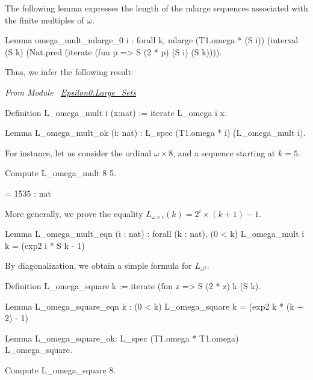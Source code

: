 The following lemma expresses the length of the mlarge sequences associated with the finite multiples of $\omega$.


\begin{Coqsrc}
Lemma omega_mult_mlarge_0 i  : forall k,
    mlarge  (T1.omega * (S i))
            (interval (S k)
                      (Nat.pred (iterate (fun p =>  S (2 * p)%
                                         (S i)
                                         (S k)))).
\end{Coqsrc}

Thus, we infer the following result:

\emph{From Module~ \href{../theories/html/hydras.Epsilon0.Large_Sets.html\#L_omega_mult}{Epsilon0.Large\_Sets}}

\begin{Coqsrc}
Definition L_omega_mult i (x:nat) :=  iterate L_omega i x.

Lemma L_omega_mult_ok (i: nat) :  L_spec (T1.omega * i) (L_omega_mult i).
\end{Coqsrc}

For instance, let us consider the ordinal $\omega\times 8$, and a sequence 
starting at $k=5$.

\begin{Coqsrc}
Compute L_omega_mult 8 5.
\end{Coqsrc}

\begin{Coqanswer}
= 1535
     : nat
\end{Coqanswer}

More generally, we prove the equality $L_{\omega\times i}(k)=2^i\times(k+1)-1$.

\begin{Coqsrc}
Lemma L_omega_mult_eqn (i : nat) :
  forall (k : nat),  (0 < k)%
                     L_omega_mult i k = (exp2 i * S k - 1)%
\end{Coqsrc}


By diagonalization, we obtain a simple formula for $L_{\omega^2}$.

\begin{Coqsrc}
Definition L_omega_square k := iterate (fun z => S (2 * z)%
                                        k
                                        (S k).

Lemma L_omega_square_eqn k :
  (0 < k)%
  L_omega_square k = (exp2 k * (k + 2) - 1)%


Lemma L_omega_square_ok: L_spec (T1.omega * T1.omega) 
          L_omega_square.

Compute L_omega_square 8.
\end{Coqsrc}

